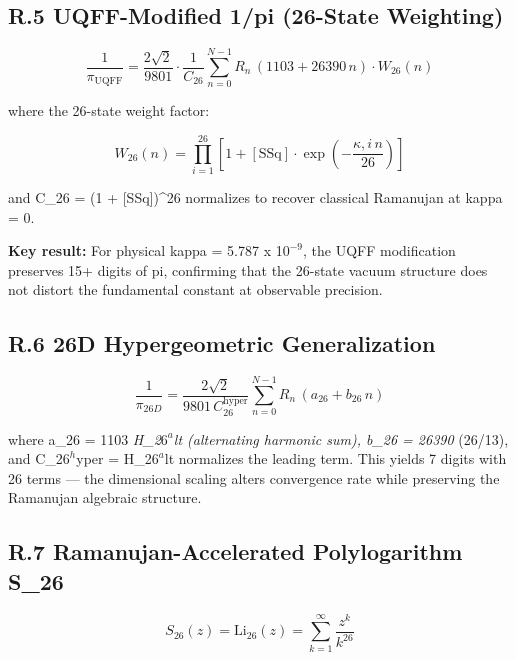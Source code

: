 \documentclass[12pt,a4paper]{article}
\begin{document}
\subsection{R.5 UQFF-Modified 1/pi (26-State Weighting)}

\begin{equation}
\frac{1}{\pi_{\mathrm{UQFF}}} = \frac{2\sqrt{2}}{9801} \cdot \frac{1}{C_{26}} \sum_{n=0}^{N-1} R_n\,(1103 + 26390\,n) \cdot W_{26}(n)
\end{equation}

where the 26-state weight factor:

\begin{equation}
W_{26}(n) = \prod_{i=1}^{26}\left[1 + [\text{SSq}] \cdot \exp\!\left(-\frac{\kappa, i\, n}{26}\right)\right]
\end{equation}

and C\_26 = (1 + [SSq])\^{}26 normalizes to recover classical Ramanujan at kappa = 0.

\textbf{Key result:} For physical kappa = 5.787 x 1$0^{-9}$, the UQFF modification preserves 15+ digits of pi, confirming that the 26-state vacuum structure does not distort the fundamental constant at observable precision.

\subsection{R.6 26D Hypergeometric Generalization}

\begin{equation}
\frac{1}{\pi_{26D}} = \frac{2\sqrt{2}}{9801\,C_{26}^{\mathrm{hyper}}} \sum_{n=0}^{N-1} R_n\,(a_{26} + b_{26}\,n)
\end{equation}

where a\_26 = 1103 \emph{ H\_2$6^{a}$lt (alternating harmonic sum), b\_26 = 26390 } (26/13), and C\_2$6^{h}$yper = H\_2$6^{a}$lt normalizes the leading term. This yields 7 digits with 26 terms --- the dimensional scaling alters convergence rate while preserving the Ramanujan algebraic structure.

\subsection{R.7 Ramanujan-Accelerated Polylogarithm S\_26}

\begin{equation}
S_{26}(z) = \text{Li}_{26}(z) = \sum_{k=1}^{\infty} \frac{z^k}{k^{26}}
\end{equation}
\end{document}
